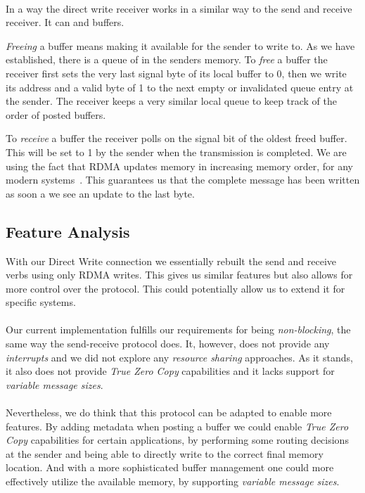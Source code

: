 \paragraph{} In a way the direct write receiver works in a similar way to the send and receive receiver. It can  and 
 buffers. 

\emph{Freeing} a buffer means making it available for the sender to write to. As we have established,  
there is a queue of  in the senders memory. To \emph{free} a buffer the receiver first sets the very last 
signal byte of its local buffer to 0, then we write its address and a valid byte of 1 to the next empty or 
invalidated queue entry at the sender. The receiver keeps a very similar local queue to keep track of the order of 
posted buffers.

To \emph{receive} a buffer the receiver polls on the signal bit of the oldest freed buffer. This will be set
to 1 by the sender when the transmission is completed. We are using the fact that RDMA updates memory in increasing memory 
order, for any modern systems~\cite{herd, farm}. This guarantees us that the complete message has been written as soon a we
see an update to the last byte.

\subsection{Feature Analysis}

With our Direct Write connection we essentially rebuilt the send and receive verbs using only RDMA writes. This gives us 
similar features but also allows for more control over the protocol. This could potentially allow us to extend it for 
specific systems.

\paragraph{} Our current implementation fulfills our requirements for being \emph{non-blocking}, the same way the send-receive
protocol does. It, however, does not provide any \emph{interrupts} and we did not explore any \emph{resource sharing} approaches.
As it stands, it also does not provide \emph{True Zero Copy} capabilities and it lacks support for 
\emph{variable message sizes}.


\paragraph{} Nevertheless, we do think that this protocol can be adapted to enable more features.
By adding metadata when posting a
buffer we could enable \emph{True Zero Copy} capabilities for certain applications, by performing some routing decisions at
the sender and being able to directly write to the correct final memory location.
And with a more sophisticated buffer management one could more effectively utilize the available memory, by supporting 
\emph{variable message sizes}.



